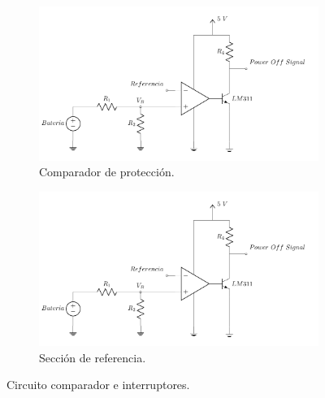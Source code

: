 \begin{figure}[H]
\centering
    	\begin{subfigure}{0.7\textwidth}
        	\centering
        	\includegraphics[width=\linewidth, page=1]{ImagenesIngenieria de Detalle/CircuitoProteccion}		
			\caption{Comparador de protección.}
        \end{subfigure}      
        
        \begin{subfigure}{0.5\textwidth}
        	\centering
        	\includegraphics[width=\linewidth, page=2]{ImagenesIngenieria de Detalle/CircuitoProteccion}				
        	\caption{Sección de referencia.}
        \end{subfigure}
	\caption{Circuito comparador e interruptores.}
	\label{fig:Comp}
\end{figure}


